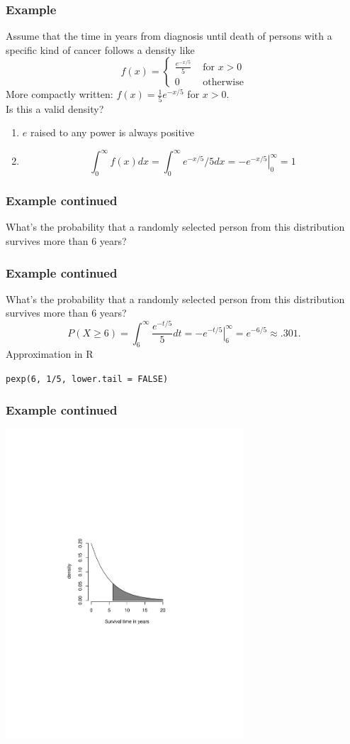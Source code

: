 \documentclass[aspectratio=169]{beamer}
\begin{document}
\begin{frame}
\frametitle{Example}
Assume that the time in years from diagnosis until death of persons
with a specific kind of cancer follows a density like
$$
f(x) = \left\{\begin{array}{ll}
    \frac{e^{-x/5}}{5} & \mbox{ for } x > 0 \\
    0                 & \mbox{ otherwise} 
\end{array} \right. 
$$
More compactly written: $f(x) = \frac{1}{5}e^{-x/5}$ for $x>0$. \\
Is this a valid density?\\
\begin{enumerate}
\item $e$ raised to any power is always positive
\item 
$$
\int_{0}^\infty f(x) dx = \int_{0}^\infty e^{-x/5} / 5 dx = \left. -e^{-x/5} \right|^{\infty}_0 = 1
$$
\end{enumerate}
\end{frame}


\begin{frame}
\frametitle{Example continued}
What's the probability that a randomly selected person from this distribution 
survives more than 6 years?
\end{frame}

\begin{frame}
\frametitle{Example continued}
What's the probability that a randomly selected person from this distribution 
survives more than 6 years?
$$
P(X \geq 6) = \int_6^\infty  \frac{e^{-t/5}}{5}dt =  \left. -e^{-t/5} \right|_{6}^\infty = e^{-6/5} \approx .301.
$$
Approximation in R 
\begin{center}
  \texttt{pexp(6, 1/5, lower.tail = FALSE)}  
\end{center}
\end{frame}

\begin{frame}
\frametitle{Example continued}
   \includegraphics[width=3.5in]{exponential.pdf}
\end{frame}
\end{document}

